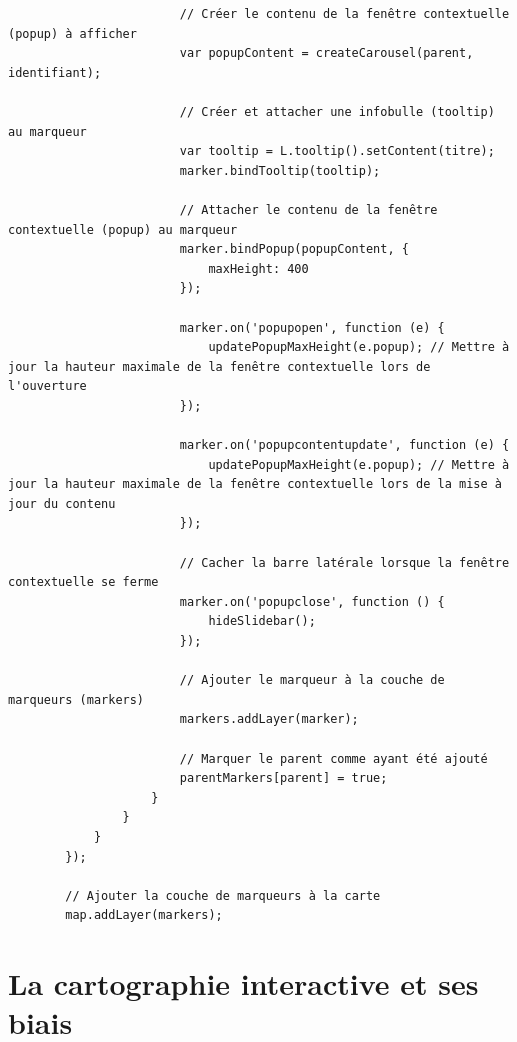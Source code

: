 \begin{lstlisting}
						// Créer le contenu de la fenêtre contextuelle (popup) à afficher
						var popupContent = createCarousel(parent, identifiant);
						
						// Créer et attacher une infobulle (tooltip) au marqueur
						var tooltip = L.tooltip().setContent(titre);
						marker.bindTooltip(tooltip);
						
						// Attacher le contenu de la fenêtre contextuelle (popup) au marqueur
						marker.bindPopup(popupContent, {
							maxHeight: 400
						});
						
						marker.on('popupopen', function (e) {
							updatePopupMaxHeight(e.popup); // Mettre à jour la hauteur maximale de la fenêtre contextuelle lors de l'ouverture
						});
						
						marker.on('popupcontentupdate', function (e) {
							updatePopupMaxHeight(e.popup); // Mettre à jour la hauteur maximale de la fenêtre contextuelle lors de la mise à jour du contenu
						});
						
						// Cacher la barre latérale lorsque la fenêtre contextuelle se ferme
						marker.on('popupclose', function () {
							hideSlidebar();
						});
						
						// Ajouter le marqueur à la couche de marqueurs (markers)
						markers.addLayer(marker);
						
						// Marquer le parent comme ayant été ajouté
						parentMarkers[parent] = true;
					}
				}
			}
		});
		
		// Ajouter la couche de marqueurs à la carte
		map.addLayer(markers);
\end{lstlisting}

\newpage

\section{La cartographie interactive et ses biais}

